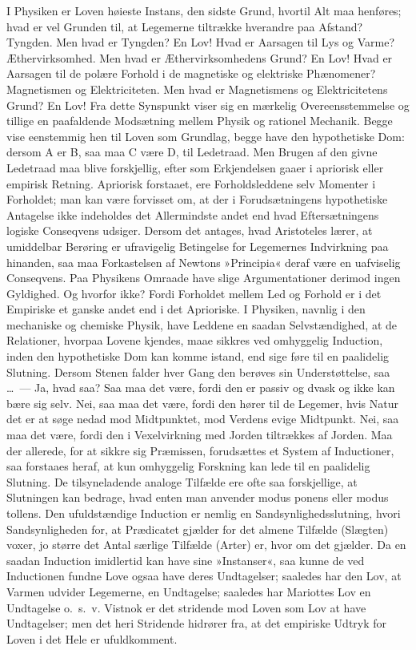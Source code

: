\documentclass[12pt]{book}
\newcommand{\apage}[1]{\marginnote{\footnotesize\textit{[#1]}}}
\begin{document}
I Physiken er Loven høieste Instans, den sidste Grund, hvortil Alt maa
henføres; hvad er vel Grunden til, at Legemerne tiltrække hverandre paa
Afstand? Tyngden. Men hvad er Tyngden? En Lov! Hvad er Aarsagen til Lys og
Varme? Æthervirksomhed. Men hvad er Æthervirksomhedens Grund? En Lov! Hvad
er Aarsagen til de polære Forhold i de magnetiske og elektriske
Phænomener? Magnetismen og Elektriciteten. Men hvad er Magnetismens og
Elektricitetens Grund? En Lov! Fra dette Synspunkt viser sig en mærkelig
Overeensstemmelse og tillige en paafaldende Modsætning mellem Physik og
rationel Mechanik. Begge vise eenstemmig hen til Loven som Grundlag, begge
have den hypothetiske Dom: dersom A er B, saa maa C være D, til Ledetraad.
Men Brugen af den givne Ledetraad maa blive forskjellig, efter som
Erkjendelsen gaaer i apriorisk eller empirisk Retning. Apriorisk forstaaet,
ere Forholdsleddene selv Momenter i Forholdet; man kan være forvisset om,
at der i Forudsætningens hypothetiske Antagelse ikke indeholdes det
Allermindste andet end hvad Eftersætningens logiske Conseqvens udsiger.
Dersom det antages, hvad Aristoteles lærer, at umiddelbar Berøring er
ufravigelig Betingelse for Legemernes Indvirkning paa hinanden, saa maa
Forkastelsen af Newtons  \apage{143} »Principia« deraf være en uafviselig Conseqvens.
Paa Physikens Omraade have slige Argumentationer derimod ingen Gyldighed.
Og hvorfor ikke? Fordi Forholdet mellem Led og Forhold er i det Empiriske
et ganske andet end i det Aprioriske. I Physiken, navnlig i den mechaniske
og chemiske Physik, have Leddene en saadan Selvstændighed, at de
Relationer, hvorpaa Lovene kjendes, maae sikkres ved omhyggelig Induction,
inden den hypothetiske Dom kan komme istand, end sige føre til en paalidelig
Slutning. Dersom Stenen falder hver Gang den berøves sin Understøttelse,
saa \ldots\ --- Ja, hvad saa? Saa maa det være, fordi den er passiv og dvask og
ikke kan bære sig selv. Nei, saa maa det være, fordi den hører til de
Legemer, hvis Natur det er at søge nedad mod Midtpunktet, mod Verdens evige
Midtpunkt. Nei, saa maa det være, fordi den i Vexelvirkning med Jorden
tiltrækkes af Jorden. Maa der allerede, for at sikkre sig Præmissen,
forudsættes et System af Inductioner, saa forstaaes heraf, at kun omhyggelig
Forskning kan lede til en paalidelig Slutning. De tilsyneladende analoge
Tilfælde ere ofte saa forskjellige, at Slutningen kan bedrage, hvad enten
man anvender modus ponens eller modus tollens. Den
ufuldstændige Induction er nemlig en Sandsynlighedsslutning, hvori
Sandsynligheden for, at Prædicatet gjælder for det almene Tilfælde
(Slægten) voxer, jo større det Antal særlige Tilfælde (Arter) er, hvor om
det gjælder. Da en saadan Induction imidlertid kan have sine »Instanser«,
saa kunne de ved Inductionen fundne Love ogsaa have deres Undtagelser; \apage{144} 
saaledes har den Lov, at Varmen udvider Legemerne, en Undtagelse; saaledes
har Mariottes Lov en Undtagelse o.\ s.\ v. Vistnok er det stridende mod Loven
som Lov at have Undtagelser; men det heri Stridende hidrører fra, at det
empiriske Udtryk for Loven i det Hele er ufuldkomment.
\end{document}
